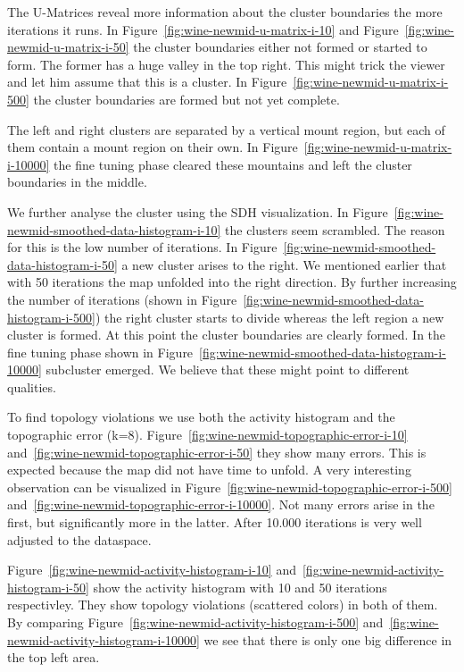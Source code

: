 \documentclass{acm_proc_article-sp}
\begin{document}
The U-Matrices reveal more information about the cluster boundaries the more iterations it runs.
In Figure~\ref{fig:wine-newmid-u-matrix-i-10} and 
Figure~\ref{fig:wine-newmid-u-matrix-i-50} the cluster boundaries either not formed or started to form. The
former has a huge valley in the top right. This might trick the viewer and let him assume that this is a cluster.
In Figure~\ref{fig:wine-newmid-u-matrix-i-500} the cluster boundaries are formed but not yet complete.

The left and right clusters are separated by a vertical mount region, but each of them contain a
mount region on their own. In Figure~\ref{fig:wine-newmid-u-matrix-i-10000} the fine tuning phase cleared these mountains and
left the cluster boundaries in the middle.

We further analyse the cluster using the SDH visualization. In Figure~\ref{fig:wine-newmid-smoothed-data-histogram-i-10} the
clusters seem scrambled. The reason for this is the low number of iterations.
In Figure~\ref{fig:wine-newmid-smoothed-data-histogram-i-50} a new cluster arises to the right. We mentioned earlier that 
with 50 iterations the map unfolded into the right direction. By further increasing the number of iterations
(shown in Figure~\ref{fig:wine-newmid-smoothed-data-histogram-i-500}) the right cluster starts to divide whereas the left region
a new cluster is formed. At this point the cluster boundaries are clearly formed. In the fine tuning phase
shown in Figure~\ref{fig:wine-newmid-smoothed-data-histogram-i-10000} subcluster emerged. We believe that these might point to different
qualities.

To find topology violations we use both the activity histogram and the topographic error (k=8).
Figure~\ref{fig:wine-newmid-topographic-error-i-10} and~\ref{fig:wine-newmid-topographic-error-i-50} they show many errors.
This is expected because the map did not have time to unfold. A very interesting observation can be
visualized in Figure~\ref{fig:wine-newmid-topographic-error-i-500} and~\ref{fig:wine-newmid-topographic-error-i-10000}.
Not many errors arise in the first, but significantly more in the latter. After 10.000 iterations is very well adjusted to
the dataspace.

Figure~\ref{fig:wine-newmid-activity-histogram-i-10} and~\ref{fig:wine-newmid-activity-histogram-i-50} show the activity
histogram with 10 and 50 iterations respectivley. They show topology violations (scattered colors) in both of them.
By comparing Figure~\ref{fig:wine-newmid-activity-histogram-i-500} and~\ref{fig:wine-newmid-activity-histogram-i-10000} 
we see that there is only one big difference in the top left area.
\end{document}
